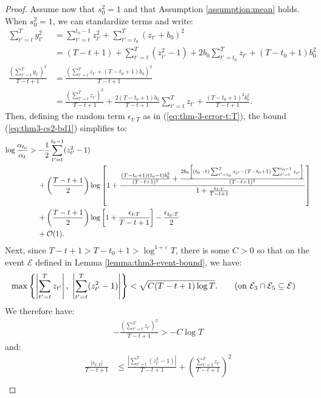 \begin{proof}
Assume now that $s_0^2 = 1$ and that Assumption \ref{assumption:mean} holds. When $s_0^2 = 1$, we can standardize terms and write:
\begin{align*}
    \sum_{t'=t}^T y_{t'}^2  &= 
    \sum_{t'=t}^{t_0-1} z_{t'}^2 + \sum_{t'=t_0}^{T} (z_{t'} + b_0)^2  \\
    &= (T-t+1) + \sum_{t'=t}^T (z_{t'}^2 -1) + 2b_0 \sum_{t'=t_0}^{T} z_{t'} + (T-t_0+1)b_0^2  \\
    \frac{\left(\sum_{t'=t}^T y_{t'}\right)^2}{T-t+1} &= \frac{\left(\sum_{t'=t}^T z_{t'} + (T - t_0+1)b_0\right)^2}{T-t+1}  \\
    &= \frac{\left(\sum_{t'=t}^T z_{t'}\right)^2}{T-t+1} + \frac{2(T-t_0+1)b_0}{T-t+1} \sum_{t'=t}^T z_{t'} + \frac{(T-t_0+1)^2b_0^2}{T-t+1}. 
\end{align*}
Then, defining the random term $\epsilon_{t:T}$ as in (\ref{eq:thm-3-error-t:T}), the bound (\ref{eq:thm3-cs2-bd1}) simplifies to:
\begin{align}
    \log \frac{\alpha_{t_0}}{\alpha_t} &> - \frac{1}{2} \sum_{t' = t}^{t_0 - 1} (z_{t'}^2-1) \notag\\
    &\quad\: + \left(\frac{T - t +1}{2}\right)\log\left[1 +\frac{\frac{(T-t_0+1)(t_0-t)b_0^2}{(T-t+1)^2} + \frac{2b_0\left[(t_0-t)\sum_{t'=t_0}^{T} z_{t'} - (T-t_0+1)\sum_{t'=t}^{t_0-1} z_{t'}\right]}{(T-t+1)^2}}{1 + \frac{\epsilon_{t:T}}{T-t+1}} \right]\notag \\
    &\quad\: + \left(\frac{T - t +1}{2}\right)\log \left[1 + \frac{\epsilon_{t:T}}{T-t+1}\right]-\frac{\epsilon_{t_0:T}}{2} \notag\\
    &\quad\: + \mathcal{O}(1).\label{eq:thm3-cs2-bd5}
\end{align}
Next, since $T-t+1 > T-t_0+1>  \log^{1+\varepsilon} T$, there is some $C>0$ so that on the event $\mathcal{E}$ defined in Lemma \ref{lemma:thm3-event-bound}, we have:
\begin{align*}
    \max\left\{\left|\sum_{t'=t}^{T} z_{t'} \right|,\; \left|\sum_{t'=t}^{T} (z^2_{t'}-1)\right|\right\}&< \sqrt{C(T-t+1)\log T}. \tag{on $\mathcal{E}_3\cap\mathcal{E}_5 \subseteq \mathcal{E}$}
\end{align*}
We therefore have:
\begin{align*}
    - \frac{\left(\sum_{t'=t}^T z_{t'}\right)^2}{T-t+1} > - C\log T
\end{align*}
and: 
\begin{align*}
    \frac{|\epsilon_{t:T}|}{T-t+1} &\leq \frac{\left|\sum_{t'=t}^{T} (z^2_{t'}-1)\right|}{T-t+1} + \left(\frac{\sum_{t'=t}^{T} z_{t'}}{T-t+1} \right)^2 \\

\end{align*}
\end{proof}
